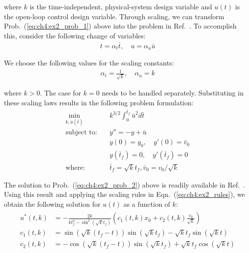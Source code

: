 \noindent where $k$ is the time-independent, physical-system design variable and $u(t)$ is the open-loop control design variable.
Through scaling, we can transform Prob.~(\ref{eq:ch4:ex2_prob_1}) above into the problem in Ref.~\cite[pp.~166--167]{Bryson1975a}. 
To accomplish this, consider the following change of variables:
\begin{gather}
\label{eq:ch4:ex2_rules}
t = \alpha_t \bar{t}, \quad u = \alpha_u \bar{u}
\end{gather}



\noindent We choose the following values for the scaling constants:
\begin{gather}
\alpha_t = \frac{1}{\sqrt{k}}, \quad \alpha_u = k
\end{gather}

\noindent where $k>0$. The case for $k=0$ needs to be handled separately.
Substituting in these scaling laws results in the following problem formulation:
\begin{subequations}
\label{eq:ch4:ex2_prob_2}
\begin{align}
\min_{k, \bar{u}(\bar{t})} \quad &  k^{3/2} \int_{0}^{\bar{t}_f} \bar{u}^2 d\bar{t} \\
\text{subject to:} \quad & y'' = - y + \bar{u} \\
& y(0) = y_0, \quad y'(0) = \bar{v}_0 \\ 
& y(\bar{t}_f) = 0, \quad y'(\bar{t}_f) = 0 \\
\text{where:} \quad & \bar{t}_f = \sqrt{k} t_f, \bar{v}_0 = v_0/\sqrt{k}
\end{align}
\end{subequations}

The solution to Prob.~(\ref{eq:ch4:ex2_prob_2}) above is readily available in Ref.~\cite{Bryson1975a}. Using this result and applying the scaling rules in Eqn.~(\ref{eq:ch4:ex2_rules}), we obtain the following solution for $u(t)$ as a function of $k$:
\begin{align}
\label{eq:ch4:ex2_usol}
\begin{aligned}
u^*(t,k) &= - \frac{2k}{k t_f^2 - \sin^2(\sqrt{k} t_f)} \left( c_1(t,k) x_0 + c_2(t,k) \frac{v_0}{\sqrt{k}} \right) \\
c_1(t,k)  &= \sin\left( \sqrt{k}(t_f - t) \right)\sin\left(\sqrt{k}t_f\right) - \sqrt{k} t_f \sin \left(\sqrt{k}t \right) \\
c_2(t,k)  &= - \cos\left(\sqrt{k}(t_f-t)\right) \sin\left(\sqrt{k}t_f\right) + \sqrt{k} t_f \cos\left(\sqrt{k}t\right)
\end{aligned}
\end{align}

